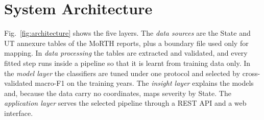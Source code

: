 \documentclass[conference]{IEEEtran}
\begin{document}
\section{System Architecture}
\label{sec:architecture}

Fig.~\ref{fig:architecture} shows the five layers. The \emph{data sources} are the State and UT annexure tables of the MoRTH reports, plus a boundary file used only for mapping. In \emph{data processing} the tables are extracted and validated, and every fitted step runs inside a pipeline so that it is learnt from training data only. In the \emph{model layer} the classifiers are tuned under one protocol and selected by cross-validated macro-F1 on the training years. The \emph{insight layer} explains the models and, because the data carry no coordinates, maps severity by State. The \emph{application layer} serves the selected pipeline through a REST API and a web interface.
\end{document}
